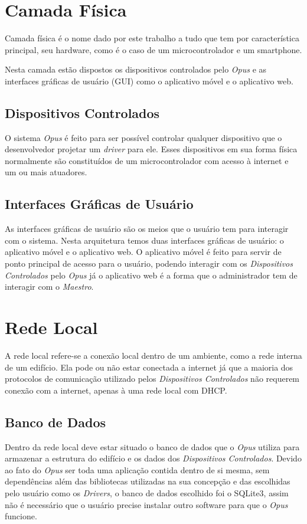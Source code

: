 \section{Camada Física}
\label{arq-subsec:camada-fisica}
Camada física é o nome dado por este trabalho a tudo que tem por característica
principal, seu hardware, como é o caso de um microcontrolador e um smartphone.

Nesta camada estão dispostos os dispositivos controlados pelo \emph{Opus} e as interfaces
gráficas de usuário (GUI) como o aplicativo móvel e o aplicativo web.

\subsection{Dispositivos Controlados}
\label{arq-subsubsec:dispositivos-controlados}
O sistema \emph{Opus} é feito para ser possível controlar qualquer dispositivo que o desenvolvedor
projetar um \emph{driver} para ele. Esses dispositivos em sua forma física normalmente
são constituídos de um microcontrolador com acesso à internet e um ou mais atuadores.

\subsection{Interfaces Gráficas de Usuário}
\label{arq-subsubsec:interfaces-graficas-usuario}
As interfaces gráficas de usuário são os meios que o usuário tem para interagir com o sistema.
Nesta arquitetura temos duas interfaces gráficas de usuário: o aplicativo móvel e o aplicativo web.
O aplicativo móvel é feito para servir de ponto principal de acesso para o usuário, podendo interagir com
os \emph{Dispositivos Controlados} pelo \emph{Opus} já o aplicativo web é a forma que o administrador
tem de interagir com o \emph{Maestro}.


\section{Rede Local}
\label{arq-subsec:rede-local}
A rede local refere-se a conexão local dentro de um ambiente, como a rede interna de um edifício. Ela pode ou não
estar conectada a internet já que a maioria dos protocolos de comunicação utilizado pelos
\emph{Dispositivos Controlados} não requerem conexão com a internet, apenas à uma rede local com DHCP.

\subsection{Banco de Dados}
\label{arq-subsubsec:rede-local-banco-dados}
Dentro da rede local deve estar situado o banco de dados que o \emph{Opus} utiliza para armazenar a estrutura
do edifício e os dados dos \emph{Dispositivos Controlados}. Devido ao fato do \emph{Opus} ser toda uma aplicação 
contida dentro de si mesma, sem dependências além das bibliotecas utilizadas na sua concepção e das 
escolhidas pelo usuário como os \emph{Drivers}, o banco de dados escolhido foi o SQLite3, assim não é necessário
que o usuário precise instalar outro software para que o \emph{Opus} funcione.

